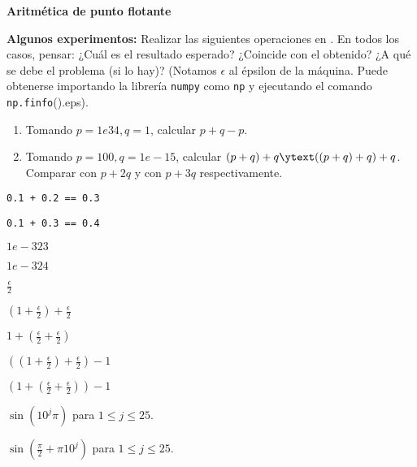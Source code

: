 \bigskip

\textbf{Aritmética de punto flotante}

\bigskip

\begin{enunciado}{\ejercicio}
  \textbf{Algunos experimentos:} Realizar las siguientes operaciones en \python. En todos los casos,
  pensar: ¿Cuál es el resultado esperado? ¿Coincide con el obtenido? ¿A qué se debe el problema (si lo hay)?
  (Notamos $\epsilon$ al épsilon de la máquina. Puede obtenerse importando la librería \texttt{numpy} como \texttt{np} y
  ejecutando el comando \texttt{np.finfo}().eps).

  \begin{enumerate}[series=ej7, label=\alph*)]
    \item Tomando $p = 1e34, q = 1$, calcular $p + q - p$.

    \item Tomando $p = 100, q = 1e-15$, calcular $(p + q) + q \ytext ((p + q) + q) + q$. Comparar con
          $p + 2q$ y con $p + 3q$ respectivamente.
  \end{enumerate}
  \begin{enumerate}[resume=ej7, label=\alph*)]
    \begin{multicols}{3}
      \item \texttt{0.1 + 0.2 == 0.3}

      \item \texttt{0.1 + 0.3 == 0.4}

      \item $1e-323$

      \item $1e-324$

      \item $\frac{\epsilon}{2}$

      \item $(1 + \frac{\epsilon}{2}) + \frac{\epsilon}{2}$
      \item $1 + (\frac{\epsilon}{2} + \frac{\epsilon}{2})$
      \item $((1 + \frac{\epsilon}{2}) + \frac{\epsilon}{2}) - 1$
      \item $(1 + (\frac{\epsilon}{2} + \frac{\epsilon}{2})) - 1$

      \item $\sin(10^j \pi)$ para $1 \leq j \leq 25$.
      \item $\sin(\frac{\pi}{2} + \pi 10^j)$ para $1 \leq j \leq 25$.
    \end{multicols}
  \end{enumerate}
\end{enunciado}

